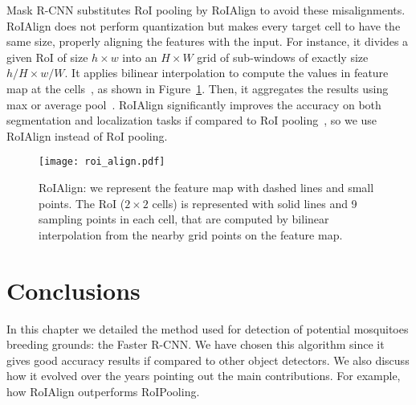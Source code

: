 Mask R-CNN substitutes RoI pooling by RoIAlign to avoid these misalignments.
RoIAlign does not perform quantization but makes every target cell to have the same size, properly aligning the features with the input.
For instance, it divides a given RoI of size $h\times w$ into an $H\times W$ grid of sub-windows of exactly size $h/H\times w/W$.
It applies bilinear interpolation to compute the values in feature map at the cells~\cite{He2017mask}, as shown in Figure~\ref{fig:roi_align}.
Then, it aggregates the results using max or average pool~\cite{goodfellow2016}.
RoIAlign significantly improves the accuracy on both segmentation and localization tasks if compared to RoI pooling~\cite{He2017mask}, so we use RoIAlign instead of RoI pooling.
%
\begin{figure}[th!]
	\centering
	\texttt{[image: roi\_align.pdf]}
	\caption[RoIAlign]{RoIAlign: we represent the feature map with dashed lines and small points. The RoI ($2\times 2$ cells) is represented with solid lines and 9 sampling points in each cell, that are computed by bilinear interpolation from the nearby grid points on the feature map.}
	\label{fig:roi_align}
\end{figure}

%
%
%


\section{Conclusions}
%
In this chapter we detailed the method used for detection of potential mosquitoes breeding grounds: the Faster R-CNN.
We have chosen this algorithm since it gives good accuracy results if compared to other object detectors.
We also discuss how it evolved over the years pointing out the main contributions.
For example, how RoIAlign outperforms RoIPooling.


